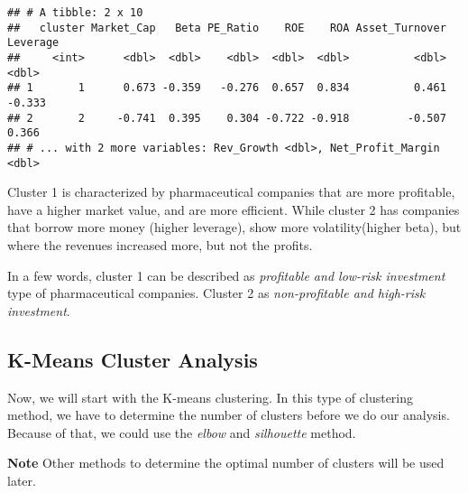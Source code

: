 \documentclass[]{article}
\newenvironment{Shaded}{\begin{snugshade}}{\end{snugshade}}
\newcommand{\KeywordTok}[1]{\textcolor[rgb]{0.13,0.29,0.53}{\textbf{#1}}}
\newcommand{\DataTypeTok}[1]{\textcolor[rgb]{0.13,0.29,0.53}{#1}}
\newcommand{\DecValTok}[1]{\textcolor[rgb]{0.00,0.00,0.81}{#1}}
\newcommand{\StringTok}[1]{\textcolor[rgb]{0.31,0.60,0.02}{#1}}
\newcommand{\CommentTok}[1]{\textcolor[rgb]{0.56,0.35,0.01}{\textit{#1}}}
\newcommand{\OperatorTok}[1]{\textcolor[rgb]{0.81,0.36,0.00}{\textbf{#1}}}
\newcommand{\NormalTok}[1]{#1}
\begin{document}
\begin{verbatim}
## # A tibble: 2 x 10
##   cluster Market_Cap   Beta PE_Ratio    ROE    ROA Asset_Turnover Leverage
##     <int>      <dbl>  <dbl>    <dbl>  <dbl>  <dbl>          <dbl>    <dbl>
## 1       1      0.673 -0.359   -0.276  0.657  0.834          0.461   -0.333
## 2       2     -0.741  0.395    0.304 -0.722 -0.918         -0.507    0.366
## # ... with 2 more variables: Rev_Growth <dbl>, Net_Profit_Margin <dbl>
\end{verbatim}

Cluster 1 is characterized by pharmaceutical companies that are more
profitable, have a higher market value, and are more efficient. While
cluster 2 has companies that borrow more money (higher leverage), show
more volatility(higher beta), but where the revenues increased more, but
not the profits.

In a few words, cluster 1 can be described as \emph{profitable and
low-risk investment} type of pharmaceutical companies. Cluster 2 as
\emph{non-profitable and high-risk investment}.

\subsection{K-Means Cluster Analysis}\label{k-means-cluster-analysis}

Now, we will start with the K-means clustering. In this type of
clustering method, we have to determine the number of clusters before we
do our analysis. Because of that, we could use the \emph{elbow} and
\emph{silhouette} method.

\textbf{Note} Other methods to determine the optimal number of clusters
will be used later.

\begin{Shaded}
\end{Shaded}
\end{document}
